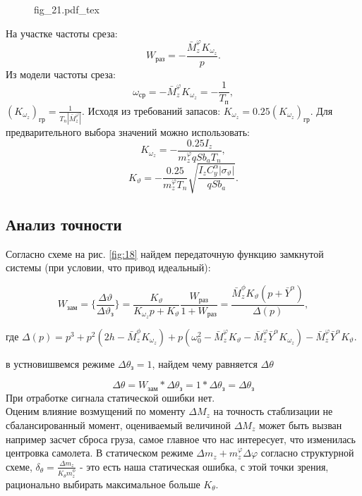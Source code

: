 \documentclass{article}
\begin{document}
\begin{figure}[H]
\centering
{fig_21.pdf_tex}
\end{figure}

На участке частоты среза:
\[
W_{раз} = -\frac{\bar{M}_z^\varphi K_{\omega_z}}{p}.
\]
Из модели частоты среза:
\[
\omega_{ср} = -\bar{M}_z^\varphi K_{\omega_z} = -\frac{1}{T_п},
\]
$(K_{\omega_z})_{гр} = \frac{1}{T_n |\bar{M}_z^\varphi|}.$
Исходя из требований запасов:
$K_{\omega_z} = 0.25 (K_{\omega_z})_{гр}.$
Для предварительного выбора значений можно использовать:
\[
K_{\omega_z} = - \frac{0.25 I_z}{{m}_z^\varphi q S b_a T_n},
\]
\[
K_{\vartheta} = - \frac{0.25}{{m}_z^\varphi T_n} \sqrt{\frac{I_z C_y^\alpha |\sigma_\vartheta|}{q S b_a}}.
\]

\subsection{Анализ точности}
Согласно схеме на рис. \ref{fig:18} найдем передаточную функцию замкнутой системы (при условии, что привод идеальный):

\begin{equation}
W_{зам}= \{\frac{\Delta \vartheta}{\Delta \vartheta_{з}}\} =\frac{K_{\vartheta}}{K_{\omega_z}p +K_{\vartheta}}\frac{W_{раз}}{1 + W_{раз}} =\frac{\bar{M}_z^\phi K_{\vartheta}(p + \bar{Y}^\alpha)}{\Delta(p)},  
\label{eq:w_zam_1}
\end{equation}

где $\Delta(p) = p^3 + p^2(2h - \bar{M}_z^\phi K_{\omega_z}) + p(\omega_0^2 -\bar{M}_z^\varphi K_\vartheta - \bar{M}_z^\varphi \bar{Y}^\alpha K_{\omega_z}) -\bar{M}_z^\varphi \bar{Y}^\alpha K_{\vartheta} $.

в устновишвемся режиме $\Delta \theta_з = 1$, найдем чему равняется $\Delta \theta$

\[
\Delta \theta = W_{зам} * \Delta \theta_з = 1* \Delta \theta_з = \Delta \theta_з
\]
При отработке сигнала статической ошибки нет. \\
Оценим влияние возмущений по моменту $\Delta M_z$ на точность стаблизации не сбалансированный момент, оцениваемый величиной $\Delta M_z$ может быть вызван например засчет сброса груза, самое главное что нас интересует, что изменилась центровка самолета. В статическом режиме $\Delta m_z + m_z^\varphi \Delta \varphi$ согласно структурной схеме, $\delta_\theta =\frac{\Delta m_z}{K_\theta m_z^\phi}$ - это есть наша статическая ошибка, с этой точки зрения, рационально выбирать максимальное больше $K_\theta$.
\end{document}
